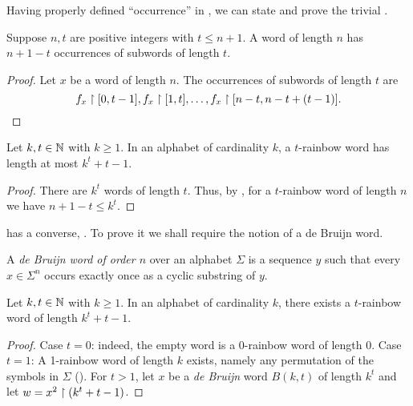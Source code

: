 		Having properly defined ``occurrence'' in , we can state and prove the trivial .
		\begin{lemma}\label{lem:num-occ}
		Suppose $n,t$ are positive integers with $t\le n+1$.
		A word of length $n$ has $n+1-t$ occurrences of subwords of length $t$.
		\end{lemma}
		\begin{proof}
			Let $x$ be a word of length $n$.
			The occurrences of subwords of length $t$ are
			\[
				f_x\upharpoonright [0,t-1],
				f_x\upharpoonright [1,t],
				\dots,
				f_x\upharpoonright [n-t,n-t+(t-1)].
			\]
		\end{proof}
		\begin{theorem}\label{sep18-2022}
			Let $k,t\in\mathbb{N}$ with $k\ge 1$.
			In an alphabet of cardinality $k$, a $t$-rainbow word has length at most $k^t+t-1$.
		\end{theorem}
		\begin{proof}
			There are $k^t$ words of length $t$.
			Thus, by , for a $t$-rainbow word of length $n$ we have $n+1-t \le k^t$.
		\end{proof}
		 has a converse,
		. To prove it we shall require the notion of a de Bruijn word.
		\begin{definition}
			\label{df:de-bruijn}
			A \emph{de Bruijn word of order $n$} over an alphabet $\Sigma$ is a sequence $y$
			such that every $x\in\Sigma^n$ occurs exactly once as a cyclic substring of $y$.
		\end{definition}
		\begin{theorem}\label{feb6-2023}
			Let $k,t\in\mathbb{N}$ with $k\ge 1$.
			In an alphabet of cardinality $k$, there exists a $t$-rainbow word of length $k^t+t-1$.
		\end{theorem}
		\begin{proof}
			Case $t=0$: indeed, the empty word is a 0-rainbow word of length 0.
			Case $t=1$:	A 1-rainbow word of length $k$ exists, namely any permutation of the symbols in $\Sigma$ ().
		For $t>1$, let $x$ be a \emph{de Bruijn} word $B(k,t)$ of length $k^t$ and let $w= x^2\upharpoonright (k^t+t-1)$.
		\end{proof}
